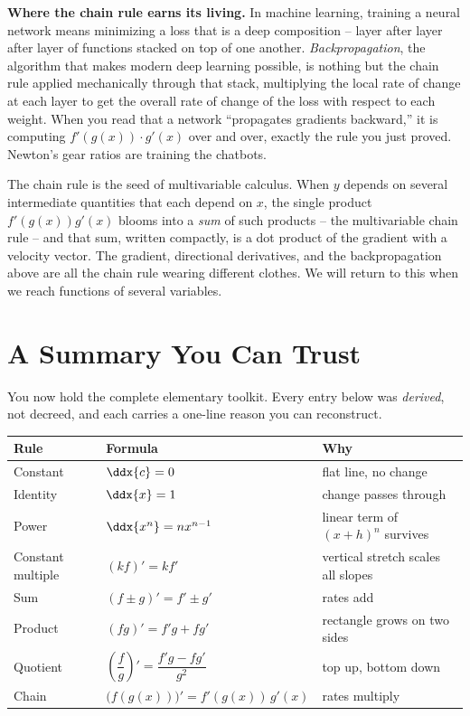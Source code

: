 \begin{applicationbox}
\textbf{Where the chain rule earns its living.} In machine learning, training a neural
network means minimizing a loss that is a deep composition -- layer after layer after
layer of functions stacked on top of one another. \emph{Backpropagation}, the algorithm
that makes modern deep learning possible, is nothing but the chain rule applied
mechanically through that stack, multiplying the local rate of change at each layer to get
the overall rate of change of the loss with respect to each weight. When you read that a
network ``propagates gradients backward,'' it is computing $f'(g(x))\cdot g'(x)$ over and
over, exactly the rule you just proved. Newton's gear ratios are training the chatbots.
\end{applicationbox}

\begin{connectionbox}
The chain rule is the seed of multivariable calculus. When $y$ depends on several
intermediate quantities that each depend on $x$, the single product $f'(g(x))g'(x)$ blooms
into a \emph{sum} of such products -- the multivariable chain rule -- and that sum, written
compactly, is a dot product of the gradient with a velocity vector. The gradient,
directional derivatives, and the backpropagation above are all the chain rule wearing
different clothes. We will return to this when we reach functions of several variables.
\end{connectionbox}

\section{A Summary You Can Trust}
\label{ch11:summary}

You now hold the complete elementary toolkit. Every entry below was \emph{derived}, not
decreed, and each carries a one-line reason you can reconstruct.

\begin{center}
\renewcommand{\arraystretch}{1.5}
\begin{tabular}{@{}lll@{}}
\toprule
\textbf{Rule} & \textbf{Formula} & \textbf{Why} \\
\midrule
Constant & $\ddx{c} = 0$ & flat line, no change \\
Identity & $\ddx{x} = 1$ & change passes through \\
Power & $\ddx{x^n} = n x^{n-1}$ & linear term of $(x+h)^n$ survives \\
Constant multiple & $(kf)' = k f'$ & vertical stretch scales all slopes \\
Sum & $(f\pm g)' = f' \pm g'$ & rates add \\
Product & $(fg)' = f'g + fg'$ & rectangle grows on two sides \\
Quotient & $\left(\dfrac{f}{g}\right)' = \dfrac{f'g - fg'}{g^2}$ & top up, bottom down \\
Chain & $\big(f(g(x))\big)' = f'(g(x))\,g'(x)$ & rates multiply \\
\bottomrule
\end{tabular}
\end{center}

